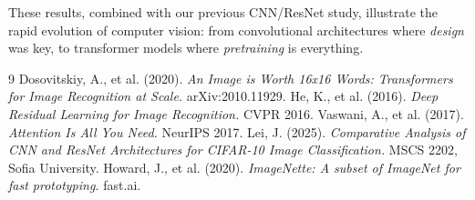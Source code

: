\documentclass[12pt]{article}
\begin{document}
These results, combined with our previous CNN/ResNet study, illustrate the rapid evolution of computer vision: from convolutional architectures where \textit{design} was key, to transformer models where \textit{pretraining} is everything.

\begin{thebibliography}{9}
 Dosovitskiy, A., et al. (2020). \textit{An Image is Worth 16x16 Words: Transformers for Image Recognition at Scale.} arXiv:2010.11929.
 He, K., et al. (2016). \textit{Deep Residual Learning for Image Recognition.} CVPR 2016.
 Vaswani, A., et al. (2017). \textit{Attention Is All You Need.} NeurIPS 2017.
 Lei, J. (2025). \textit{Comparative Analysis of CNN and ResNet Architectures for CIFAR-10 Image Classification.} MSCS 2202, Sofia University.
 Howard, J., et al. (2020). \textit{ImageNette: A subset of ImageNet for fast prototyping.} fast.ai.
\end{thebibliography}
\end{document}

